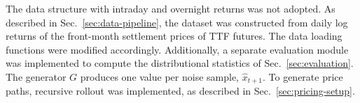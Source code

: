 The data structure with intraday and overnight returns was not adopted. As described in Sec.~\ref{sec:data-pipeline}, the dataset was constructed from daily log returns of the front-month settlement prices of TTF futures. The data loading functions were modified accordingly. Additionally, a separate evaluation module was implemented to compute the distributional statistics of Sec.~\ref{sec:evaluation}. The generator $G$ produces one value per noise sample, $\hat{x}_{t+1}$. To generate price paths, recursive rollout was implemented, as described in Sec.~\ref{sec:pricing-setup}.

